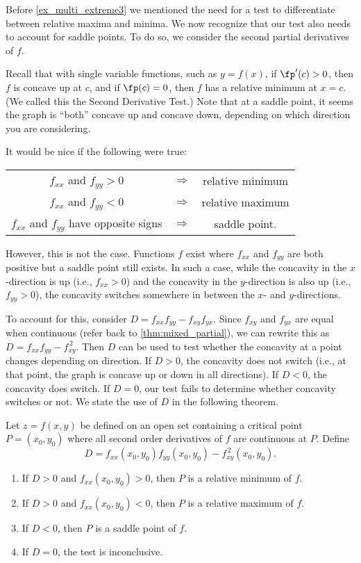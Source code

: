 Before \autoref{ex_multi_extreme3} we mentioned the need for a test to differentiate between relative maxima and minima. We now recognize that our test also needs to account for saddle points. To do so, we consider the second partial derivatives of $f$.

Recall that with single variable functions, such as $y=f(x)$, if $\fp'(c)>0$, then $f$ is concave up at $c$, and if $\fp(c) =0$, then $f$ has a relative minimum at $x=c$. (We called this the Second Derivative Test.) Note that at a saddle point, it seems the graph is ``both'' concave up and concave down, depending on which direction you are considering.

It would be nice if the following were true:
\begin{center}
	\begin{tabular}{ccc}
	$f_{xx}$ and $f_{yy} >0$ & $\Rightarrow$ & relative minimum\\
	$f_{xx}$ and $f_{yy} <0$ & $\Rightarrow$ & relative maximum\\
	$f_{xx}$ and $f_{yy}$ have opposite signs & $\Rightarrow$ & saddle point.
	\end{tabular}
\end{center}

However, this is not the case. Functions $f$ exist where $f_{xx}$ and $f_{yy}$ are both positive  but a saddle point still exists. In such a case, while the concavity in the $x$-direction is up (i.e., $f_{xx}>0$) and the concavity in the $y$-direction is also up (i.e., $f_{yy}>0$), the concavity switches somewhere in between the $x$- and $y$-directions.

To account for this, consider $D = f_{xx}f_{yy}-f_{xy}f_{yx}$. Since $f_{xy}$ and $f_{yx}$ are equal when continuous (refer back to \autoref{thm:mixed_partial}), we can rewrite this as $D = f_{xx}f_{yy}-f_{xy}^{\,2}$. Then $D$ can be used to test whether the concavity at a point changes depending on direction. If $D>0$, the concavity does not switch (i.e., at that point, the graph is concave up or down in all directions). If $D<0$, the concavity does switch. If $D=0$, our test fails to determine whether concavity switches or not. We state the use of $D$ in the following theorem.

{Let $z=f(x,y)$ be defined on an open set containing a critical point $P=(x_0,y_0)$ where all second order derivatives of $f$ are continuous at $P$. Define
$$D = f_{xx}(x_0,y_0)f_{yy}(x_0,y_0)-f_{xy}^{\,2}(x_0,y_0).$$
\begin{enumerate}
	\item If $D>0$ and $f_{xx}(x_0,y_0)>0$, then $P$ is a relative minimum of $f$.
	\item If $D>0$ and $f_{xx}(x_0,y_0)<0$, then $P$ is a relative maximum of $f$.
	\item If $D<0$, then $P$ is a saddle point of $f$.
	\item If $D=0$, the test is inconclusive.
\end{enumerate}}

